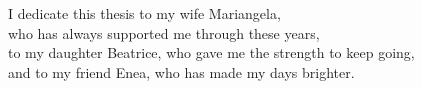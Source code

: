 
\newpage
\thispagestyle{empty}





\begin{flushright}
	I dedicate this thesis to my wife Mariangela,\\ who has always supported me through these years,\\ to my daughter Beatrice, who gave me the strength to keep going,\\ and to my friend Enea, who has made my days brighter.
\end{flushright}
\vspace*{\fill}

\newpage
\thispagestyle{empty}











